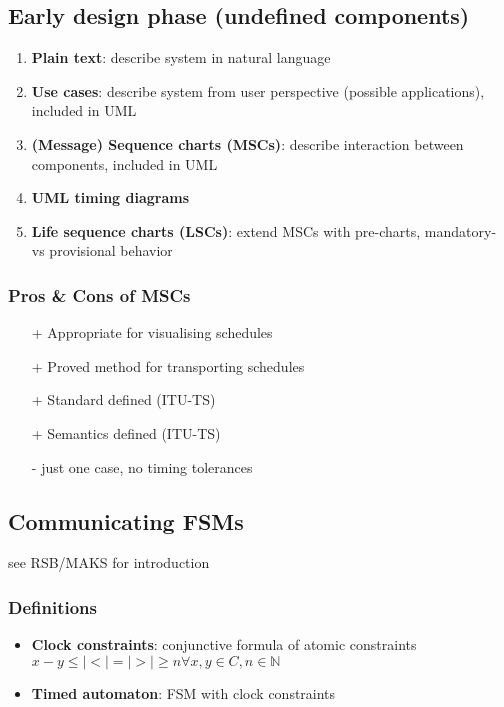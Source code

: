 \documentclass{article}
\begin{document}
\subsection{Early design phase (undefined components)}
\begin{enumerate}
  \item \textbf{Plain text}: describe system in natural language
  \item \textbf{Use cases}: describe system from user perspective (possible applications), included in UML
  \item \textbf{(Message) Sequence charts (MSCs)}: describe interaction between components, included in UML
  \item \textbf{UML timing diagrams}
  \item \textbf{Life sequence charts (LSCs)}: extend MSCs with pre-charts, mandatory- vs provisional behavior
\end{enumerate}

\subsubsection{Pros \& Cons of MSCs}
\begin{itemize}
  \item[+] Appropriate for visualising schedules
  \item[+] Proved method for transporting schedules
  \item[+] Standard defined (ITU-TS)
  \item[+] Semantics defined (ITU-TS)
  \item[-] just one case, no timing tolerances
\end{itemize}

\subsection{Communicating FSMs}
see RSB/MAKS for introduction

\subsubsection{Definitions}
\begin{itemize}
  \item \textbf{Clock constraints}: conjunctive formula of atomic constraints $x-y \leq|<|=|>|\geq n\forall x,y\in C, n\in \mathbb{N}$
  \item \textbf{Timed automaton}: FSM with clock constraints
\end{itemize}
\end{document}

